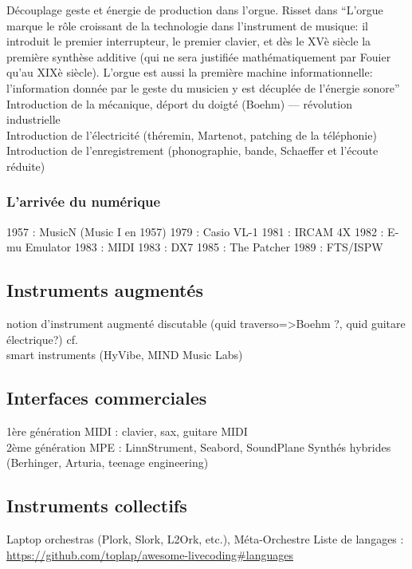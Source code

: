 Découplage geste et énergie de production dans l'orgue.
Risset dans \cite{genevois_les_1999} ``L'orgue marque le rôle croissant de la technologie dans l'instrument de musique: il introduit le premier interrupteur, le premier clavier, et dès le XVè siècle la première synthèse additive (qui ne sera justifiée mathématiquement par Fouier qu'au XIXè siècle). L'orgue est aussi la première machine informationnelle: l'information donnée par le geste du musicien y est décuplée de l'énergie sonore''\\
Introduction de la mécanique, déport du doigté (Boehm) — révolution industrielle\\
Introduction de l'électricité (théremin, Martenot, patching de la téléphonie)\\
Introduction de l'enregistrement (phonographie, bande, Schaeffer et l'écoute réduite)\\

\subsubsection{L'arrivée du numérique}

1957 : MusicN (Music I en 1957)
1979 : Casio VL-1
1981 : IRCAM 4X
1982 : E-mu Emulator
1983 : MIDI
1983 : DX7
1985 : The Patcher
1989 : FTS/ISPW

\subsection{Instruments augmentés}
notion d'instrument augmenté discutable (quid traverso=>Boehm ?, quid guitare électrique?) cf. \href{{sec:ephemeral:longevity_stability}}\\
smart instruments (HyVibe, MIND Music Labs)

\subsection{Interfaces commerciales}
1ère génération MIDI : clavier, sax, guitare MIDI\\
2ème génération MPE :  LinnStrument, Seabord, SoundPlane
Synthés hybrides (Berhinger, Arturia, teenage engineering)
\subsection{Instruments collectifs}
Laptop orchestras (Plork, Slork, L2Ork, etc.), Méta-Orchestre
Liste de langages : \url{https://github.com/toplap/awesome-livecoding#languages}

